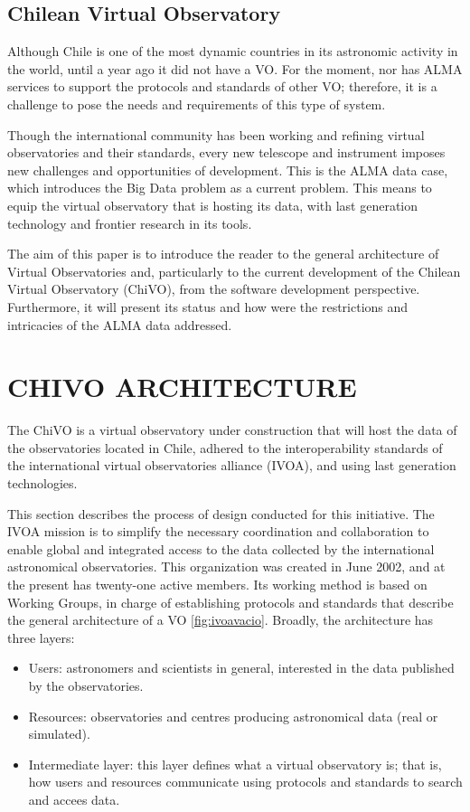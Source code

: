 \documentclass[]{spie}
\begin{document}
\subsection{Chilean Virtual Observatory}
\label{sec:chivo}
Although Chile is one of the most dynamic countries in its astronomic activity
in the world, until a year ago it did not have a VO.  For the moment, nor has
ALMA services to support the protocols and standards of other VO; therefore, it
is a challenge to pose the needs and requirements of this type of system.

Though the international community has been working and refining virtual
observatories and their standards, every new telescope and instrument imposes
new challenges and opportunities of development.  This is the ALMA data case,
which introduces the Big Data problem as a current problem.  This means to
equip the virtual observatory that is hosting its data, with last generation
technology and frontier research in its tools.

The aim of this paper is to introduce the reader to the general architecture of
Virtual Observatories and, particularly to the current development of the
Chilean Virtual Observatory (ChiVO), from the software development perspective.
Furthermore, it will present its status and how were the restrictions and
intricacies of the ALMA data addressed.

\section{CHIVO ARCHITECTURE} 
The ChiVO is a virtual observatory under construction that will host the data of the observatories located in Chile, adhered to the interoperability standards of the international virtual observatories alliance (IVOA), and using last generation technologies. 

This section describes the process of design conducted for this initiative.
The IVOA mission is to simplify the necessary coordination and collaboration to enable global and integrated access to the data collected by the international astronomical observatories. This organization was created in June 2002, and at the present has twenty-one active members.  Its working method is based on Working Groups, in charge of establishing protocols and standards that describe the general architecture of a VO \ref{fig:ivoavacio}.  Broadly, the architecture has three layers:
\begin{itemize}
    \item Users:  astronomers and scientists in general, interested in 
        the data published by the observatories.
    \item Resources: observatories and centres producing astronomical 
        data (real or simulated).
    \item Intermediate layer:  this layer defines what a virtual observatory 
        is; that is, how users and resources communicate using protocols and 
        standards to search and accees data.
\end{itemize}
\end{document}
